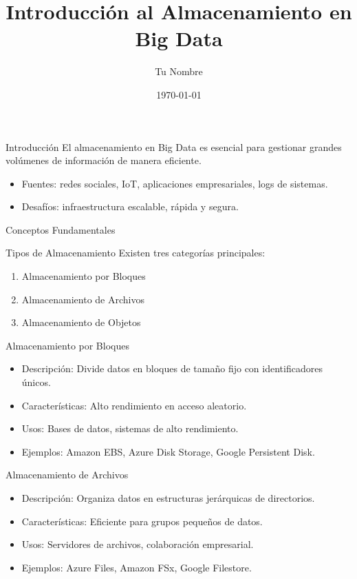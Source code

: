 \documentclass[presentation]{beamer}
\author{Tu Nombre}
\date{\today{}}
\title{Introducción al Almacenamiento en Big Data}
\begin{document}
\maketitle

\begin{frame}[label={sec:org1fd29bb}]{Introducción}
El almacenamiento en Big Data es esencial para gestionar grandes volúmenes de información de manera eficiente.
\begin{itemize}
\item Fuentes: redes sociales, IoT, aplicaciones empresariales, logs de sistemas.
\item Desafíos: infraestructura escalable, rápida y segura.
\end{itemize}
\end{frame}

\begin{frame}[label={sec:orge94a22b}]{Conceptos Fundamentales}
\begin{block}{Tipos de Almacenamiento}
Existen tres categorías principales:
\begin{enumerate}
\item Almacenamiento por Bloques
\item Almacenamiento de Archivos
\item Almacenamiento de Objetos
\end{enumerate}

\begin{block}{Almacenamiento por Bloques}
\begin{itemize}
\item \alert{\alert{Descripción:}} Divide datos en bloques de tamaño fijo con identificadores únicos.
\item \alert{\alert{Características:}} Alto rendimiento en acceso aleatorio.
\item \alert{\alert{Usos:}} Bases de datos, sistemas de alto rendimiento.
\item \alert{\alert{Ejemplos:}} Amazon EBS, Azure Disk Storage, Google Persistent Disk.
\end{itemize}
\end{block}

\begin{block}{Almacenamiento de Archivos}
\begin{itemize}
\item \alert{\alert{Descripción:}} Organiza datos en estructuras jerárquicas de directorios.
\item \alert{\alert{Características:}} Eficiente para grupos pequeños de datos.
\item \alert{\alert{Usos:}} Servidores de archivos, colaboración empresarial.
\item \alert{\alert{Ejemplos:}} Azure Files, Amazon FSx, Google Filestore.
\end{itemize}
\end{block}


\end{block}
\end{frame}
\end{document}
